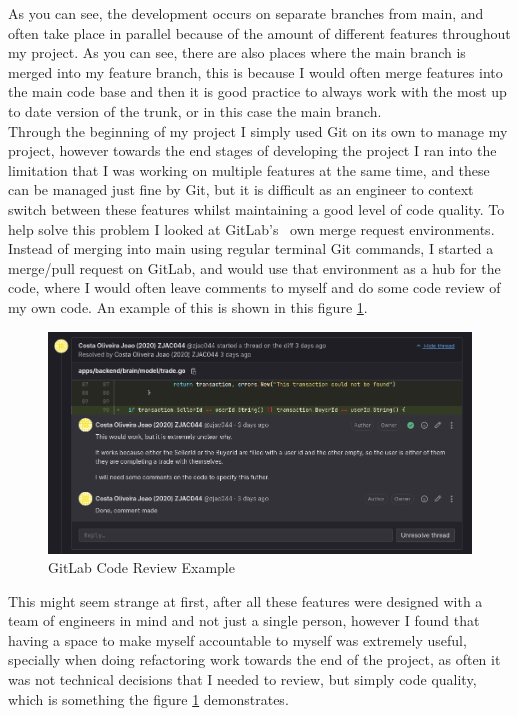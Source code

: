 \documentclass[titlepage]{article}
\begin{document}
As you can see, the development occurs on separate branches from main, and often take place in parallel because of the amount of different features throughout my project. As you can see, there are also places where the main branch is merged into my feature branch, this is because I would often merge features into the main code base and then it is good practice to always work with the most up to date version of the trunk, or in this case the main branch. \\

Through the beginning of my project I simply used Git on its own to manage my project, however towards the end stages of developing the project I ran into the limitation that I was working on multiple features at the same time, and these can be managed just fine by Git, but it is difficult as an engineer to context switch between these features whilst maintaining a good level of code quality. To help solve this problem I looked at GitLab's~\cite{gitlab_cite} own merge request environments. Instead of merging into main using regular terminal Git commands, I started a merge/pull request on GitLab, and would use that environment as a hub for the code, where I would often leave comments to myself and do some code review of my own code. An example of this is shown in this figure \ref{gitlab}. \\

\begin{figure}[h!]
\includegraphics[width=\textwidth]{../Diagrams/GitLab.png}
  \caption{GitLab Code Review Example}
\label{gitlab}
\end{figure}

This might seem strange at first, after all these features were designed with a team of engineers in mind and not just a single person, however I found that having a space to make myself accountable to myself was extremely useful, specially when doing refactoring work towards the end of the project, as often it was not technical decisions that I needed to review, but simply code quality, which is something the figure \ref{gitlab} demonstrates. \\
\end{document}
